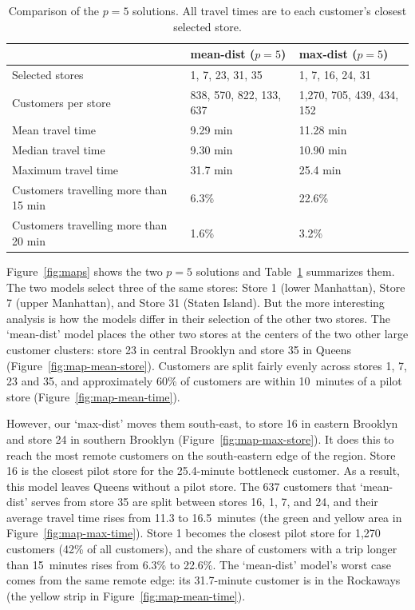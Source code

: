 \documentclass{article}
\begin{document}
\begin{table}[htbp]
\centering
\small
\begin{tabular}{lll}
\toprule
 & mean-dist ($p = 5$) & max-dist ($p = 5$) \\ \midrule
Selected stores & 1, 7, 23, 31, 35 & 1, 7, 16, 24, 31 \\
Customers per store & 838, 570, 822, 133, 637 & 1,270, 705, 439, 434, 152 \\
Mean travel time & 9.29 min & 11.28 min \\
Median travel time & 9.30 min & 10.90 min \\
Maximum travel time & 31.7 min & 25.4 min \\
Customers travelling more than 15 min & 6.3\% & 22.6\% \\
Customers travelling more than 20 min & 1.6\% & 3.2\% \\ \bottomrule
\end{tabular}
\caption{Comparison of the $p = 5$ solutions. All travel times are to each customer's closest 
selected store.}
\label{tab:p5}
\end{table}

Figure~\ref{fig:maps} shows the two $p = 5$ solutions and Table~\ref{tab:p5} summarizes them. 
The two models select three of the same stores: Store 1 (lower Manhattan), Store 7 (upper Manhattan),
and Store 31 (Staten Island). But the more interesting analysis is how the models differ in their 
selection of the other two stores. The `mean-dist' model places the other two stores at the centers of the two other large customer 
clusters: store 23 in central Brooklyn and store 35 in Queens (Figure~\ref{fig:map-mean-store}). 
Customers are split fairly evenly across stores 1, 7, 23 and 35, and approximately 60\% of customers are within 
10~minutes of a pilot store (Figure~\ref{fig:map-mean-time}).


However, our `max-dist' moves them south-east, to store 16 in eastern Brooklyn and store 24 in southern 
Brooklyn (Figure~\ref{fig:map-max-store}). It does this to reach the most remote customers on the 
south-eastern edge of the region. Store 16 is the closest pilot store for the 25.4-minute 
bottleneck customer. As a result, this model leaves Queens without a pilot store. The 637 customers 
that `mean-dist' serves from store 35 are split between stores 16, 1, 7, and 24, and their average travel time 
rises from 11.3 to 16.5~minutes (the green and yellow area in Figure~\ref{fig:map-max-time}). Store 1 
becomes the closest pilot store for 1,270 customers (42\% of all customers), and the share of customers 
with a trip longer than 15~minutes rises from 6.3\% to 22.6\%. The `mean-dist' model's worst case comes 
from the same remote edge: its 31.7-minute customer is in the Rockaways (the yellow strip in 
Figure~\ref{fig:map-mean-time}).
\end{document}
